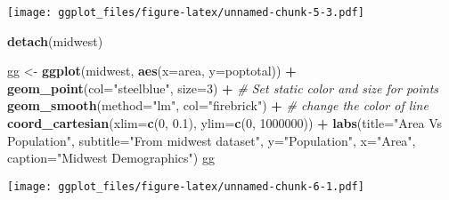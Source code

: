 \documentclass[]{article}
\newenvironment{Shaded}{\begin{snugshade}}{\end{snugshade}}
\newcommand{\KeywordTok}[1]{\textcolor[rgb]{0.13,0.29,0.53}{\textbf{#1}}}
\newcommand{\DataTypeTok}[1]{\textcolor[rgb]{0.13,0.29,0.53}{#1}}
\newcommand{\DecValTok}[1]{\textcolor[rgb]{0.00,0.00,0.81}{#1}}
\newcommand{\FloatTok}[1]{\textcolor[rgb]{0.00,0.00,0.81}{#1}}
\newcommand{\StringTok}[1]{\textcolor[rgb]{0.31,0.60,0.02}{#1}}
\newcommand{\CommentTok}[1]{\textcolor[rgb]{0.56,0.35,0.01}{\textit{#1}}}
\newcommand{\OperatorTok}[1]{\textcolor[rgb]{0.81,0.36,0.00}{\textbf{#1}}}
\newcommand{\NormalTok}[1]{#1}
\begin{document}
\texttt{[image: ggplot\_files/figure-latex/unnamed-chunk-5-3.pdf]}

\begin{Shaded}
\begin{Highlighting}[]
\KeywordTok{detach}\NormalTok{(midwest)}
\end{Highlighting}
\end{Shaded}

\begin{Shaded}
\begin{Highlighting}[]
\NormalTok{gg <-}\StringTok{ }\KeywordTok{ggplot}\NormalTok{(midwest, }\KeywordTok{aes}\NormalTok{(}\DataTypeTok{x=}\NormalTok{area, }\DataTypeTok{y=}\NormalTok{poptotal)) }\OperatorTok{+}\StringTok{ }
\StringTok{  }\KeywordTok{geom_point}\NormalTok{(}\DataTypeTok{col=}\StringTok{"steelblue"}\NormalTok{, }\DataTypeTok{size=}\DecValTok{3}\NormalTok{) }\OperatorTok{+}\StringTok{   }\CommentTok{# Set static color and size for points}
\StringTok{  }\KeywordTok{geom_smooth}\NormalTok{(}\DataTypeTok{method=}\StringTok{"lm"}\NormalTok{, }\DataTypeTok{col=}\StringTok{"firebrick"}\NormalTok{) }\OperatorTok{+}\StringTok{  }\CommentTok{# change the color of line}
\StringTok{  }\KeywordTok{coord_cartesian}\NormalTok{(}\DataTypeTok{xlim=}\KeywordTok{c}\NormalTok{(}\DecValTok{0}\NormalTok{, }\FloatTok{0.1}\NormalTok{), }\DataTypeTok{ylim=}\KeywordTok{c}\NormalTok{(}\DecValTok{0}\NormalTok{, }\DecValTok{1000000}\NormalTok{)) }\OperatorTok{+}\StringTok{ }
\StringTok{  }\KeywordTok{labs}\NormalTok{(}\DataTypeTok{title=}\StringTok{"Area Vs Population"}\NormalTok{, }\DataTypeTok{subtitle=}\StringTok{"From midwest dataset"}\NormalTok{, }\DataTypeTok{y=}\StringTok{"Population"}\NormalTok{, }\DataTypeTok{x=}\StringTok{"Area"}\NormalTok{, }\DataTypeTok{caption=}\StringTok{"Midwest Demographics"}\NormalTok{)}
\NormalTok{gg}
\end{Highlighting}
\end{Shaded}

\texttt{[image: ggplot\_files/figure-latex/unnamed-chunk-6-1.pdf]}
\end{document}
